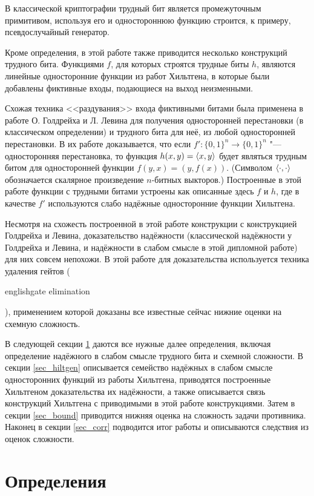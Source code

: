 \documentclass[oneside, a4paper]{article}
\theoremstyle{plain}
\theoremstyle{remark}
\DeclarePairedDelimiter\ang{\langle}{\rangle}
\begin{document}
В классической криптографии трудный бит является промежуточным примитивом,
используя его и одностороннюю функцию строится, к примеру, псевдослучайный
генератор.

Кроме определения, в этой работе также приводится несколько конструкций трудного
бита. Функциями $f$, для которых строятся трудные биты $h$, являются линейные
односторонние функции из работ Хильтгена, в которые были добавлены фиктивные
входы, подающиеся на выход неизменными.

Схожая техника <<раздувания>> входа фиктивными битами была применена в работе
О. Голдрейха и Л. Левина \cite{goldreich_levin} для получения односторонней
перестановки (в классическом определении) и трудного бита для неё, из любой
односторонней перестановки. В их работе доказывается, что если $f' : \{0, 1\}^n
\to \{0, 1\}^n$ "--- односторонняя перестановка, то функция $h(x, y) = \ang{x,
y}$ будет являться трудным битом для односторонней функции $f(y, x) = (y,
f(x))$. (Символом $\ang{\cdot, \cdot}$ обозначается скалярное произведение
$n$-битных выкторов.) Построенные в этой работе функции с трудными битами
устроены как описанные здесь $f$ и $h$, где в качестве $f'$ используются слабо
надёжные односторонние функции Хильтгена.

Несмотря на схожесть построенной в этой работе конструкции с конструкцией
Голдрейха и Левина, доказательство надёжности (классической надёжности у
Голдрейха и Левина, и надёжности в слабом смысле в этой дипломной работе) для них
совсем непохожи. В этой работе для доказательства используется техника удаления
гейтов (\begin{foreignlanguage}{english}gate elimination\end{foreignlanguage}),
применением которой доказаны все известные сейчас нижние оценки на схемную
сложность.

В следующей секции \ref{sec_defs} даются все нужные далее определения, включая
определение надёжного в слабом смысле трудного бита и схемной сложности.
В секции \ref{sec_hiltgen} описывается семейство надёжных в слабом смысле
односторонних функций из работы Хильтгена, приводятся построенные Хильтгеном
доказательства их надёжности, а также описывается связь конструкций Хильтгена
с приводимыми в этой работе конструкциями. Затем в секции \ref{sec_bound}
приводится нижняя оценка на сложность задачи противника. Наконец в секции
\ref{sec_corr} подводится итог работы и описываются следствия из оценок
сложности.

\section{Определения}
\label{sec_defs}
\end{document}
